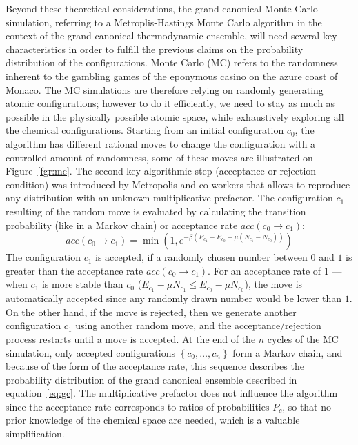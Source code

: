 \documentclass[main.tex]{subfiles}
\begin{document}
Beyond these theoretical considerations, the grand canonical Monte Carlo simulation, referring to a Metroplis-Hastings Monte Carlo algorithm in the context of the grand canonical thermodynamic ensemble, will need several key characteristics in order to fulfill the previous claims on the probability distribution of the configurations. Monte Carlo (MC) refers to the randomness inherent to the gambling games of the eponymous casino on the azure coast of Monaco. The MC simulations are therefore relying on randomly generating atomic configurations; however  to do it efficiently, we need to stay as much as possible in the physically possible atomic space, while exhaustively exploring all the chemical configurations. 
Starting from an initial configuration $c_0$, the algorithm has different rational moves to change the configuration with a controlled amount of randomness, some of these moves are illustrated on Figure~\ref{fgr:mc}. The second key algorithmic step (acceptance or rejection condition) was introduced by Metropolis and co-workers that allows to reproduce any distribution with an unknown multiplicative prefactor.\autocite{Metropolis1949} The configuration $c_1$ resulting of the random move is evaluated by calculating the transition probability (like in a Markov chain) or acceptance rate $acc(c_0 \rightarrow c_1)$: 
\begin{equation}
  acc(c_0 \rightarrow c_1) = \min\left(1, e^{-\beta\left(E_{c_1}-E_{c_0}-\mu \left(N_{c_1}-N_{c_0}\right)\right) }\right)
\end{equation}
The configuration $c_1$ is accepted, if a randomly chosen number between $0$ and $1$ is greater than the acceptance rate $acc(c_0 \rightarrow c_1)$. For an acceptance rate of $1$ --- when $c_1$ is more stable than $c_0$ ($E_{c_1}-\mu N_{c_1}\leq E_{c_0}-\mu N_{c_0}$), the move is automatically accepted since any randomly drawn number would be lower than $1$. On the other hand, if the move is rejected, then we generate another configuration $c_1$ using another random move, and the acceptance/rejection process restarts until a move is accepted. At the end of the $n$ cycles of the MC simulation, only accepted configurations $\left\{c_0,\ldots,c_n\right\}$ form a Markov chain, and because of the form of the acceptance rate, this sequence describes the probability distribution of the grand canonical ensemble described in equation~\ref{eq:gc}. The multiplicative prefactor does not influence the algorithm since the acceptance rate corresponds to ratios of probabilities $P_c$, so that no prior knowledge of the chemical space are needed, which is a valuable simplification.
\end{document}
